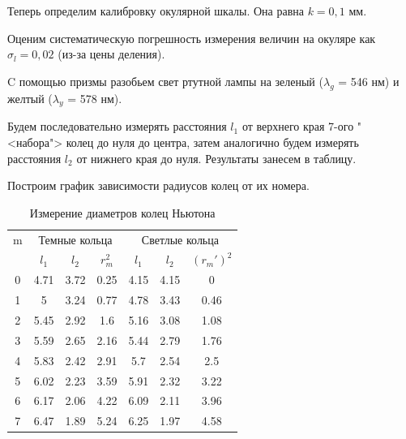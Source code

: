 \documentclass[a4paper, 12pt]{article}%
\begin{document}
\item Теперь определим калибровку окулярной шкалы. Она равна $ k = 0,1 $ мм.

\item Оценим систематическую погрешность измерения величин на окуляре как $ \sigma_l = 0,02 $ (из-за цены деления).
	
\item C помощью призмы разобьем свет ртутной лампы на зеленый ($ \lambda_g $ = 546 нм) и желтый ($ \lambda_y $ = 578 нм).
	
\item Будем последовательно измерять расстояния $ l_1 $ от верхнего края 7-ого "<набора"> колец до нуля до центра, затем аналогично будем измерять расстояния $ l_2 $ от нижнего края до нуля. Результаты занесем в таблицу. 

\item Построим график зависимости радиусов колец от их номера. 

		\begin{table}[h!]
		\caption{Измерение диаметров колец Ньютона}
		\begin{center}
			\begin{tabular}{|c|c|c|c|c|c|c|}
				\hline
				m & \multicolumn{3}{|c|}{Темные кольца} & \multicolumn{3}{|c|}{Светлые кольца} \\
				\cline{2-7}
				& $ l_1 $& $ l_2 $ & $ r_m^2 $ &$ l_1 $& $ l_2 $ & $ (r_m')^2 $ \\
				\hline
				0 & 4.71 & 3.72 & 0.25 & 4.15 & 4.15 & 0 \\
				1 & 5 & 3.24 & 0.77 & 4.78 & 3.43 & 0.46 \\
				2 & 5.45 & 2.92 & 1.6 & 5.16 & 3.08 & 1.08 \\
				3 & 5.59 & 2.65 & 2.16 & 5.44 & 2.79 & 1.76 \\
				4 & 5.83 & 2.42 & 2.91 & 5.7 & 2.54 & 2.5 \\
				5 & 6.02 & 2.23 & 3.59 & 5.91 & 2.32 & 3.22 \\
				6 & 6.17 & 2.06 & 4.22 & 6.09 & 2.11 & 3.96 \\
				7 & 6.47 & 1.89 & 5.24 & 6.25 & 1.97 & 4.58 \\
				\hline
			\end{tabular}
		\end{center}
		\label{table}
	\end{table}
\end{document}
